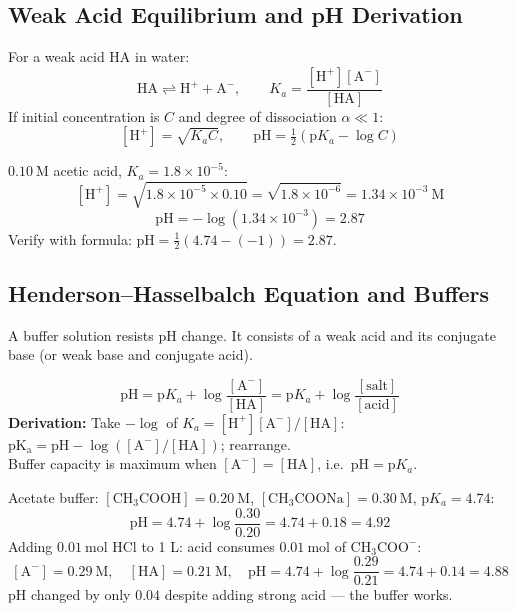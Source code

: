 \documentclass[12pt,a4paper]{article}
\begin{document}
\subsection{Weak Acid Equilibrium and pH Derivation}
For a weak acid HA in water:
\[
\mathrm{HA} \rightleftharpoons \mathrm{H^+} + \mathrm{A^-}, \qquad K_a = \frac{[\mathrm{H^+}][\mathrm{A^-}]}{[\mathrm{HA}]}
\]
If initial concentration is $C$ and degree of dissociation $\alpha \ll 1$:
\[
[\mathrm{H^+}] = \sqrt{K_a C}, \qquad \mathrm{pH} = \tfrac{1}{2}(\mathrm{p}K_a - \log C)
\]

\begin{tcolorbox}[examplebox, title={Solved Example: pH of Acetic Acid}]
$0.10\ \mathrm{M}$ acetic acid, $K_a = 1.8\times10^{-5}$:
\[
[\mathrm{H^+}] = \sqrt{1.8\times10^{-5}\times0.10} = \sqrt{1.8\times10^{-6}} = 1.34\times10^{-3}\ \mathrm{M}
\]
\[
\mathrm{pH} = -\log(1.34\times10^{-3}) = 2.87
\]
Verify with formula: $\mathrm{pH} = \tfrac12(4.74 - (-1)) = 2.87$. \checkmark
\end{tcolorbox}

\subsection{Henderson--Hasselbalch Equation and Buffers}
A buffer solution resists pH change. It consists of a weak acid and its conjugate base (or weak base and conjugate acid).

\begin{tcolorbox}[formulabox, title={Henderson--Hasselbalch Equation}]
\[
\mathrm{pH} = \mathrm{p}K_a + \log\frac{[\mathrm{A^-}]}{[\mathrm{HA}]} = \mathrm{p}K_a + \log\frac{[\text{salt}]}{[\text{acid}]}
\]
\textbf{Derivation:} Take $-\log$ of $K_a = [\mathrm{H^+}][\mathrm{A^-}]/[\mathrm{HA}]$: $\mathrm{pK_a} = \mathrm{pH} - \log([\mathrm{A^-}]/[\mathrm{HA}])$; rearrange.\\
Buffer capacity is maximum when $[\mathrm{A^-}] = [\mathrm{HA}]$, i.e.\ $\mathrm{pH} = \mathrm{p}K_a$.
\end{tcolorbox}

\begin{tcolorbox}[examplebox, title={Solved Example: Buffer pH and Its Change on Adding Acid}]
Acetate buffer: $[\mathrm{CH_3COOH}] = 0.20\ \mathrm{M}$, $[\mathrm{CH_3COONa}] = 0.30\ \mathrm{M}$, $\mathrm{p}K_a = 4.74$:
\[
\mathrm{pH} = 4.74 + \log\frac{0.30}{0.20} = 4.74 + 0.18 = 4.92
\]
Adding $0.01\ \mathrm{mol}$ HCl to 1 L: acid consumes $0.01\ \mathrm{mol}$ of $\mathrm{CH_3COO^-}$:
\[
[\mathrm{A^-}] = 0.29\ \mathrm{M},\quad [\mathrm{HA}] = 0.21\ \mathrm{M},\quad
\mathrm{pH} = 4.74 + \log\frac{0.29}{0.21} = 4.74 + 0.14 = 4.88
\]
pH changed by only $0.04$ despite adding strong acid --- the buffer works.
\end{tcolorbox}
\end{document}
